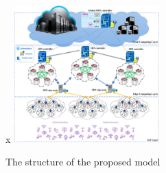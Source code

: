 \documentclass[conference]{IEEEtran}
\begin{document}
	\begin{figure}
x		\centering
		\includegraphics[width=0.5\textwidth]{figures/mfo-architecture.png}
		\caption{The structure of the proposed model \cite{caching-2}}
		\label{fig:lifetime-freshness}
	\end{figure}
\end{document}
